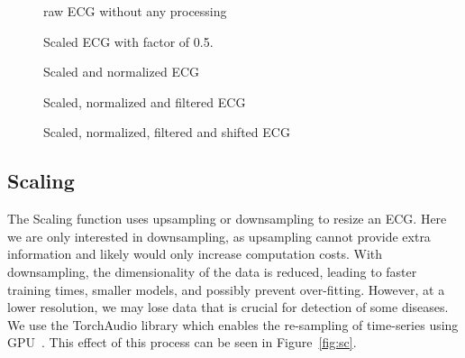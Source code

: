 \documentclass{article}
\begin{document}
\begin{figure}[htbp]
\centering
  \caption{raw ECG without any processing}\label{fig:raw}
  
  \caption{Scaled ECG with factor of 0.5.}\label{fig:sc}
  
  \caption{Scaled and normalized ECG}\label{fig:sc_n}

  \caption{Scaled, normalized and filtered ECG}\label{fig:sc_n_bp}

  \caption{Scaled, normalized, filtered and shifted ECG}\label{fig:sc_n_bp_sh}
\end{figure}


\subsection{Scaling}

The Scaling function uses upsampling or downsampling to resize an ECG. Here we are only interested in downsampling, as upsampling cannot provide extra information and likely would only increase computation costs. With downsampling, the dimensionality of the data is reduced, leading to faster training times, smaller models, and possibly prevent over-fitting. However, at a lower resolution, we may lose data that is crucial for detection of some diseases. We use the TorchAudio library which enables the re-sampling of time-series using GPU~\cite{yang2021torchaudio}. This effect of this process can be seen in Figure~\ref{fig:sc}.
\end{document}
